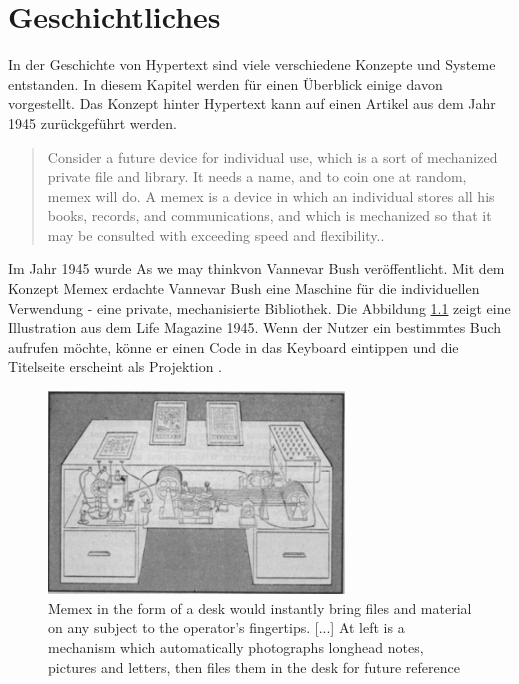 \chapter{Geschichtliches}
\label{ch:Geschichtlich}

In der Geschichte von Hypertext sind viele verschiedene Konzepte und Systeme entstanden. In diesem Kapitel werden für einen Überblick einige davon vorgestellt. Das Konzept hinter Hypertext kann auf einen Artikel aus dem Jahr 1945 zurückgeführt werden.

\begin{quote}
	\glqq Consider a future device for individual use, which is a sort of mechanized private file and library. It needs a name, and to coin one at random, memex will do. A memex is a device in which an individual stores all his books, records, and communications, and which is mechanized so that it may be consulted with exceeding speed and flexibility.\grqq{ }\cite[Section 6]{Bush1945}.
\end{quote}

Im Jahr 1945 wurde \glqq As we may think\grqq{ }von Vannevar Bush veröffentlicht. Mit dem Konzept \glqq Memex\grqq{ } erdachte Vannevar Bush eine Maschine für die individuellen Verwendung - eine private, mechanisierte Bibliothek. Die Abbildung \ref{fig:memex} zeigt eine Illustration aus dem Life Magazine 1945. Wenn der Nutzer ein bestimmtes Buch aufrufen möchte, könne er einen Code in das Keyboard eintippen und die Titelseite erscheint als Projektion \cite[S.121]{Life1945} \cite[Section 6]{Bush1945}. 

\begin{figure}[H]
	\centering
	\includegraphics[width=0.7\textwidth]{image/memex}
	\caption{\glqq Memex in the form of a desk would instantly bring files and material on any subject to the operator's fingertips. [...] At left is a mechanism which automatically photographs longhead notes, pictures and letters, then files them in the desk for future reference\grqq{ } \cite[S.123]{Life1945}}
	\label{fig:memex}
\end{figure}

